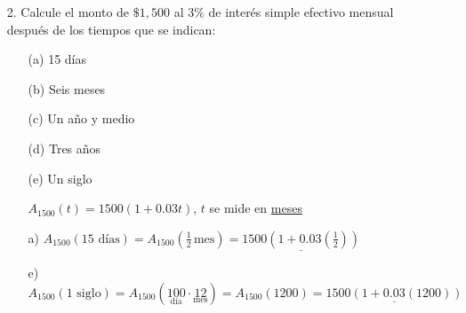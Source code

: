 \begin{enumerate}
\item[2.] Calcule el monto de $\$1,500$ al $3\%$ de interés simple efectivo mensual después de los tiempos que se indican:
\begin{enumerate}
\item[(a)] 15 días
\item[(b)] Seis meses
\item[(c)] Un año y medio
\item[(d)] Tres años
\item[(e)] Un siglo
\end{enumerate}

\begin{enumerate}
\item[] $A_{1500}(t)=1500(1+0.03t)$, $t$ se mide en \underline{meses}
\item[a)] $A_{1500}(\text{15 días}) = A_{1500}\left( \frac{1}{2} \, \text{mes}\right)=     \underline{1500\left(1+0.03\left( \frac{1}{2}\right)  \right)}$
\item[e)] $A_{1500}(\text{1 siglo}) = A_{1500}\left(\underset{\text{día}}{100} \cdot \underset{\text{mes}}{12}\right)=A_{1500}(1200) = \underline{1500(1+0.03(1200))} $
\end{enumerate}

\end{enumerate}


